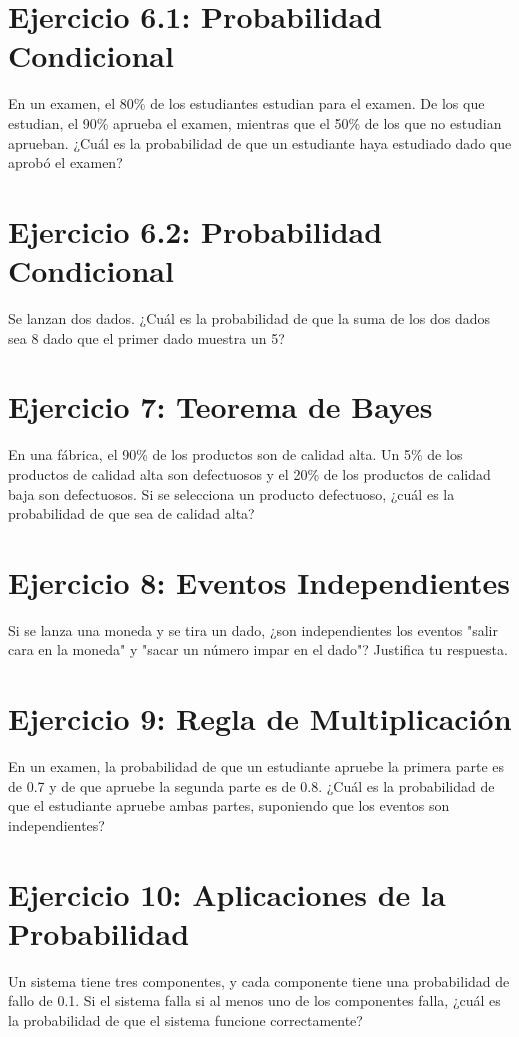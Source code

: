 \documentclass[a4paper,openright,10pt]{article}
\begin{document}
\section*{Ejercicio 6.1: Probabilidad Condicional}
En un examen, el 80\% de los estudiantes estudian para el examen. De los que estudian, el 90\% aprueba el examen, mientras que el 50\% de los que no estudian aprueban. ¿Cuál es la probabilidad de que un estudiante haya estudiado dado que aprobó el examen?


\section*{Ejercicio 6.2: Probabilidad Condicional}
Se lanzan dos dados. ¿Cuál es la probabilidad de que la suma de los dos dados sea 8 dado que el primer dado muestra un 5?

\section*{Ejercicio 7: Teorema de Bayes}
En una fábrica, el 90\% de los productos son de calidad alta. Un 5\% de los productos de calidad alta son defectuosos y el 20\% de los productos de calidad baja son defectuosos. Si se selecciona un producto defectuoso, ¿cuál es la probabilidad de que sea de calidad alta?

\section*{Ejercicio 8: Eventos Independientes}
Si se lanza una moneda y se tira un dado, ¿son independientes los eventos "salir cara en la moneda" y "sacar un número impar en el dado"? Justifica tu respuesta.

\section*{Ejercicio 9: Regla de Multiplicación}
En un examen, la probabilidad de que un estudiante apruebe la primera parte es de 0.7 y de que apruebe la segunda parte es de 0.8. ¿Cuál es la probabilidad de que el estudiante apruebe ambas partes, suponiendo que los eventos son independientes?

\section*{Ejercicio 10: Aplicaciones de la Probabilidad}
Un sistema tiene tres componentes, y cada componente tiene una probabilidad de fallo de 0.1. Si el sistema falla si al menos uno de los componentes falla, ¿cuál es la probabilidad de que el sistema funcione correctamente?
\end{document}
